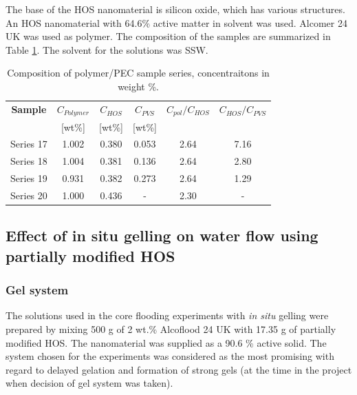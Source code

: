 \documentclass[nanomaterials,article,submit,moreauthors,pdftex]{Definitions/mdpi}
\begin{document}

The base of the HOS nanomaterial is silicon oxide, which has various structures. An HOS nanomaterial with 64.6\% active matter in solvent was used. Alcomer 24 UK was used as polymer. The composition of the samples are summarized in Table \ref{tab:polyPecComp}. The solvent for the solutions was SSW.

\begin{table}[h!] 

\centering
\caption{Composition of polymer/PEC sample series, concentraitons in weight \%.}
\label{tab:polyPecComp}
\begin{tabular}{c c c c c c } 
\toprule
\textbf{Sample} & \textbf{$C_{Polymer}$} & \textbf{$C_{HOS}$} & \textbf{$C_{PVS}$} & \textbf{$C_{pol}/C_{HOS}$} & \textbf{$C_{HOS}/C_{PVS}$} \\ 
&[wt\%]& [wt\%] & [wt\%] && \\
\midrule 
Series 17   & 1.002   & 0.380 & 0.053 & 2.64 & 7.16\\
Series 18   & 1.004   & 0.381 & 0.136 & 2.64 & 2.80\\ 
Series 19   & 0.931   & 0.382 & 0.273 & 2.64 & 1.29\\ 
Series 20   & 1.000   & 0.436 & - & 2.30     & - \\
\bottomrule
\end{tabular}
\end{table}

\subsection{Effect of in situ gelling on water flow using partially modified HOS \label{sec:lactamide}}
\subsubsection{Gel system}
The solutions used in the core flooding experiments with \textit{in situ} gelling were prepared by mixing 500 g of 2 wt.\% Alcoflood 24 UK with 17.35 g of partially modified HOS. The nanomaterial was supplied as a 90.6 \% active solid. The system chosen for the experiments was considered as the most promising with regard to delayed gelation and formation of strong gels (at the time in the project when decision of gel system was taken).
\end{document}
